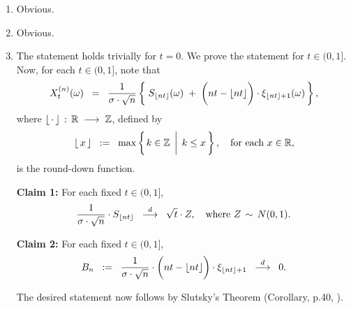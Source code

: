 \proof
\begin{enumerate}
\item	Obvious.
\item	Obvious.
\item	The statement holds trivially for $t = 0$.
		We prove the statement for $t \in (0,1]$.
		Now, for each $t \in (0,1]$, note that
		\begin{equation*}
		X^{(n)}_{t}(\omega)
		\;\; = \;\;
		\dfrac{1}{\sigma\cdot\sqrt{n}}
		\left\{\;
		S_{\lfloor nt \rfloor}(\omega) \;+\; \left(\overset{{\color{white}1}}{nt} - \lfloor nt \rfloor\right)\cdot\xi_{\lfloor nt \rfloor+1}(\omega)
		\,\right\},
		\end{equation*}
		where $\lfloor\,\cdot\,\rfloor\,:\,\mathbb{R}\;\longrightarrow\;\mathbb{Z}$, defined by
		\begin{equation*}
		\lfloor\,x\,\rfloor
		\;\;:=\;\;
		\max\left\{
		\left. k \in \overset{{\color{white}1}}{\Z} \,\;\right\vert\; k \leq x
		\,\right\},
		\quad
		\textnormal{for each $x \in \Re$},
		\end{equation*}
		is the round-down function.

		\vskip 0.5cm
		\begin{center}
		\begin{minipage}{6.0in}
		\noindent
		\textbf{Claim 1:}
		\quad For each fixed $t \in (0,1]$,
		\begin{equation*}
		\dfrac{1}{\sigma\cdot\sqrt{n}}
		\cdot
		S_{\lfloor nt \rfloor}
		\;\; \overset{d}{\longrightarrow} \;\;
		\sqrt{t}\cdot Z,
		\quad
		\textnormal{where $Z\,\sim\,N(0,1)$}.
		\end{equation*}
		\end{minipage}
		\end{center}
		
		\vskip 0.5cm
		\begin{center}
		\begin{minipage}{6.0in}
		\noindent
		\textbf{Claim 2:}
		\quad For each fixed $t \in (0,1]$,
		\begin{equation*}
		B_{n} \;\; := \;\;
		\dfrac{1}{\sigma\cdot\sqrt{n}}
		\cdot
		\left(\overset{{\color{white}1}}{nt} - \lfloor nt \rfloor\right)
		\cdot
		\xi_{\lfloor nt \rfloor + 1}
		\;\; \overset{d}{\longrightarrow} \;\;
		0.
		\end{equation*}
		\end{minipage}
		\end{center}
		The desired statement now follows by Slutsky's Theorem (Corollary, p.40, \cite{Ferguson1996}).
		

\end{enumerate}
